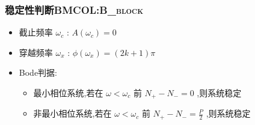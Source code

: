 \documentclass[table]{beamer}
\begin{document}
\subsubsection[稳定性判断]{稳定性判断\hfill{}\textsc{BMCOL:B\_block}}
\label{sec:org3326e55}
\begin{itemize}
\item 截止频率 \(\omega_c\) : \(A(\omega_c)=0\)
\item 穿越频率 \(\omega_x\) : \(\phi(\omega_x)=(2k+1)\pi\)
\item <3->Bode判据:
\begin{itemize}
\item 最小相位系统,若在 \(\omega<\omega_c\) 前 \(N_+-N_-=0\) ,则系统稳定
\item 非最小相位系统,若在 \(\omega<\omega_c\) 前 \(N_+-N_-=\frac{P}{2}\) ,则系统稳定
\end{itemize}
\end{itemize}
\end{document}
